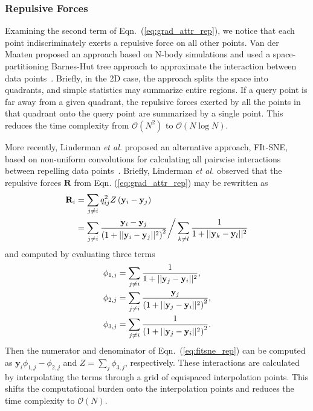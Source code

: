\documentclass[letter]{article}
\begin{document}
\subsubsection*{Repulsive Forces}

Examining the second term of Eqn.~(\ref{eq:grad_attr_rep}), we notice that each
point indiscriminately exerts a repulsive force on all other points. Van der
Maaten proposed an approach based on N-body simulations and used a
space-partitioning Barnes-Hut tree approach to approximate the interaction
between data points~\cite{van2014accelerating}. Briefly, in the 2D case, the
approach splits the space into quadrants, and simple statistics may summarize entire regions.  If a query point is far away from a given quadrant, the
repulsive forces exerted by all the points in that quadrant onto the query point
are summarized by a single point. This reduces the time complexity from
$\mathcal{O}(N^2)$ to $\mathcal{O}(N \log N)$.

More recently, Linderman \textit{et al.} proposed an alternative approach,
FIt-SNE, based on non-uniform convolutions for calculating all pairwise
interactions between repelling data points~\cite{linderman2019fast}. Briefly,
Linderman \textit{et al.} observed that the repulsive forces $\mathbf{R}$ from
Eqn. (\ref{eq:grad_attr_rep}) may be rewritten as \begin{align}
\mathbf{R}_i &= \sum_{j \neq i} q_{ij}^2 Z \left ( \mathbf{y}_i - \mathbf{y}_j \right ) \notag \\
&= \sum_{j \neq i} \frac{\mathbf{y}_i - \mathbf{y}_j}{\left ( 1 + || \mathbf{y}_i - \mathbf{y}_j ||^2 \right )^{2}}
\bigg/
\sum_{k \neq l} \frac{1}{1 + || \mathbf{y}_k - \mathbf{y}_l || ^2} \label{eq:fitsne_rep}
\end{align} 
and computed by evaluating three terms
\begin{align}
\phi_{1, j} &= \sum_{j \neq i} \frac{1}{1 + || \mathbf{y}_j - \mathbf{y}_i ||^2}, \notag \\
\phi_{2, j} &= \sum_{j \neq i} \frac{\mathbf{y}_j}{\left( 1 + || \mathbf{y}_j - \mathbf{y}_i ||^2 \right)^2}, \notag \\
\phi_{3, j} &= \sum_{j \neq i} \frac{1}{\left( 1 + || \mathbf{y}_j - \mathbf{y}_i ||^2 \right)^2}. \label{eq:fitsne_terms}
\end{align}
Then the numerator and denominator of Eqn.~(\ref{eq:fitsne_rep}) can be
computed as $\mathbf{y}_i \phi_{1,j} - \phi_{2,j}$ and $Z = \sum_j \phi_{3,j}$,
respectively. These interactions are calculated by interpolating the terms
through a grid of equispaced interpolation points. This shifts the
computational burden onto the interpolation points and reduces the time
complexity to $\mathcal{O}(N)$.
\end{document}
